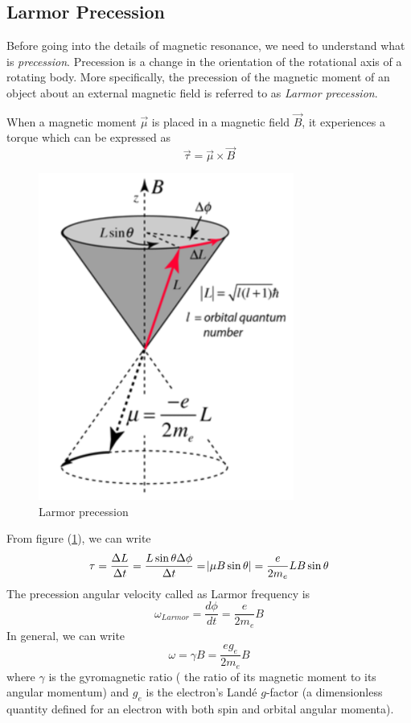 \documentclass[%
 reprint,
nofootinbib,
 amsmath,amssymb,
 aps,
floatfix,
]{revtex4-2}
\begin{document}
    \subsection{Larmor Precession}
    Before going into the details of magnetic resonance, we need to understand what is \textit{precession}. Precession is a change in the orientation of the rotational axis of a rotating body. More specifically, the precession of the magnetic moment of an object about an external magnetic field is referred to as \textit{Larmor precession}.
    \par
    When a magnetic moment $\Vec{\mu}$ is placed in a magnetic field $\Vec{B}$, it experiences a torque which can be expressed as
    \begin{equation}
        \Vec{\tau} = \Vec{\mu} \times \Vec{B}
    \end{equation}
    \begin{figure}
        \centering
        \includegraphics[scale = 0.8]{Figures/larmor.png}
        \caption{Larmor precession}
        \label{fig:larmor}
    \end{figure}
    From figure (\ref{fig:larmor}), we can write
    \begin{equation}
        \tau = \dfrac{\Delta L}{\Delta t} = \dfrac{L \sin \theta \Delta \phi}{\Delta t} = \abs{\mu B \sin \theta} = \dfrac{e}{2 m_e} LB \sin \theta
    \end{equation}
    The precession angular velocity called as Larmor frequency is
    \begin{equation}
        \omega_{Larmor} = \dfrac{d \phi}{d t} = \dfrac{e}{2 m_e} B
    \end{equation}
    In general, we can write
    \begin{equation}
        \omega = \gamma B = \dfrac{e g_e}{2 m_e} B
    \end{equation}
    where $\gamma$ is the gyromagnetic ratio ( the ratio of its magnetic moment to its angular momentum) and $g_e$ is the electron's Land\'e $g$-factor (a dimensionless quantity defined for an electron with both spin and orbital angular momenta).
\end{document}

